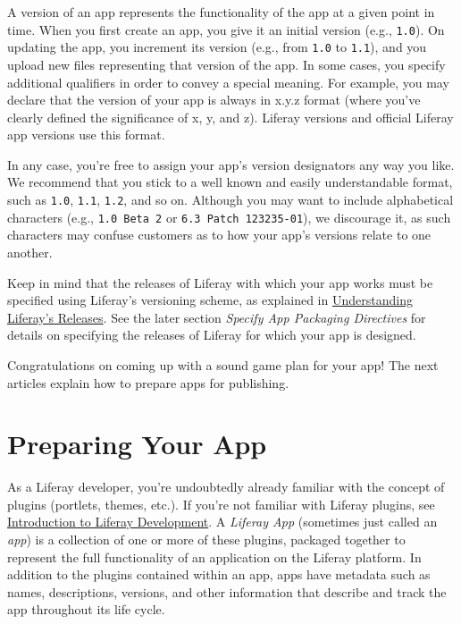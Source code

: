 A version of an app represents the functionality of the app at a given
point in time. When you first create an app, you give it an initial
version (e.g., \texttt{1.0}). On updating the app, you increment its
version (e.g., from \texttt{1.0} to \texttt{1.1}), and you upload new
files representing that version of the app. In some cases, you specify
additional qualifiers in order to convey a special meaning. For example,
you may declare that the version of your app is always in x.y.z format
(where you've clearly defined the significance of x, y, and z). Liferay
versions and official Liferay app versions use this format.

In any case, you're free to assign your app's version designators any
way you like. We recommend that you stick to a well known and easily
understandable format, such as \texttt{1.0}, \texttt{1.1}, \texttt{1.2},
and so on. Although you may want to include alphabetical characters
(e.g., \texttt{1.0\ Beta\ 2} or \texttt{6.3\ Patch\ 123235-01}), we
discourage it, as such characters may confuse customers as to how your
app's versions relate to one another.

Keep in mind that the releases of Liferay with which your app works must
be specified using Liferay's versioning scheme, as explained in
\href{/docs/7-2/deploy/-/knowledge_base/d/understanding-liferays-releases}{Understanding
Liferay's Releases}. See the later section \emph{Specify App Packaging
Directives} for details on specifying the releases of Liferay for which
your app is designed.

Congratulations on coming up with a sound game plan for your app! The
next articles explain how to prepare apps for publishing.

\chapter{Preparing Your App}\label{preparing-your-app}

As a Liferay developer, you're undoubtedly already familiar with the
concept of plugins (portlets, themes, etc.). If you're not familiar with
Liferay plugins, see \href{/docs/7-2/appdev}{Introduction to Liferay
Development}. A \emph{Liferay App} (sometimes just called an \emph{app})
is a collection of one or more of these plugins, packaged together to
represent the full functionality of an application on the Liferay
platform. In addition to the plugins contained within an app, apps have
metadata such as names, descriptions, versions, and other information
that describe and track the app throughout its life cycle.

